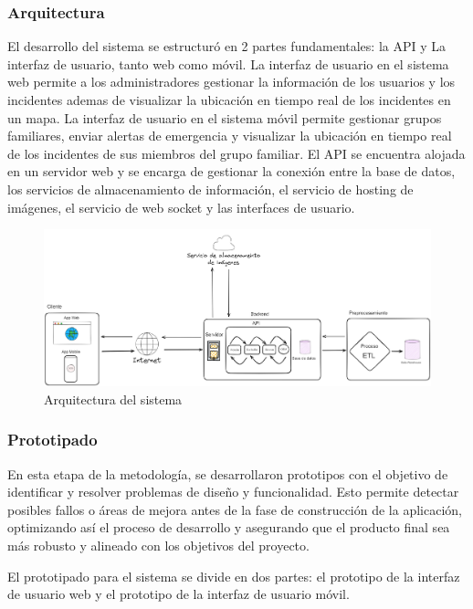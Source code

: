 \subsubsection{Arquitectura}

El desarrollo del sistema se estructuró en 2 partes fundamentales: la API y La interfaz de usuario, tanto web como móvil.
La interfaz de usuario en el sistema web permite a los administradores gestionar la información de los usuarios y los incidentes
ademas de visualizar la ubicación en tiempo real de los incidentes en un mapa. La interfaz de usuario en el sistema móvil
permite gestionar grupos familiares, enviar alertas de emergencia y visualizar la ubicación en tiempo real de los incidentes de sus
miembros del grupo familiar. El API se encuentra alojada en un servidor web y se encarga de gestionar la conexión entre la base de
datos, los servicios de almacenamiento de información, el servicio de hosting de imágenes, el servicio de web socket y las interfaces
de usuario.

\begin{figure}[H]
    \centering
    \includegraphics[width=1.1\textwidth]{chapters/III-resultados-y-discusion/resources/images/arquitectura.png}
    \caption{Arquitectura del sistema}
    \label{fig:arquitectura}
\end{figure}


\subsubsection{Prototipado}

En esta etapa de la metodología, se desarrollaron prototipos con el objetivo de identificar y resolver problemas de diseño y funcionalidad.
Esto permite detectar posibles fallos o áreas de mejora antes de la fase de construcción de la aplicación, optimizando así el proceso de
desarrollo y asegurando que el producto final sea más robusto y alineado con los objetivos del proyecto.

El prototipado para el sistema se divide en dos partes: el prototipo de la interfaz de usuario web y el prototipo de la interfaz de usuario móvil.

